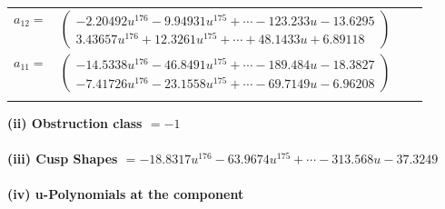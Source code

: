 \documentclass[1p]{elsarticle_modified}
\theoremstyle{definition}
\begin{document}
\begin{tabular}{m{7pt} m{180pt} m{7pt} m{180pt} }
\flushright $a_{12}=$&$\begin{pmatrix}-2.20492 u^{176}-9.94931 u^{175}+\cdots-123.233 u-13.6295\\3.43657 u^{176}+12.3261 u^{175}+\cdots+48.1433 u+6.89118\end{pmatrix}$ \\
\flushright $a_{11}=$&$\begin{pmatrix}-14.5338 u^{176}-46.8491 u^{175}+\cdots-189.484 u-18.3827\\-7.41726 u^{176}-23.1558 u^{175}+\cdots-69.7149 u-6.96208\end{pmatrix}$\\&\end{tabular}
\flushleft \textbf{(ii) Obstruction class $= -1$}\\~\\
\flushleft \textbf{(iii) Cusp Shapes $= -18.8317 u^{176}-63.9674 u^{175}+\cdots-313.568 u-37.3249$}\\~\\
\newpage\renewcommand{\arraystretch}{1}
\flushleft \textbf{(iv) u-Polynomials at the component}\newline \\
\end{document}
